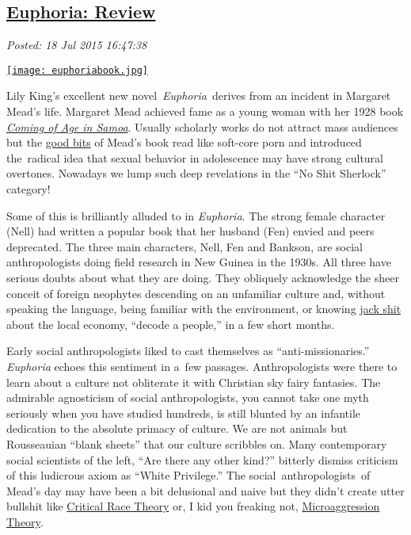 %

\subsection*{\href{https://bakerjd99.wordpress.com/2015/07/18/euphoria-review/}{Euphoria: Review}}


\noindent\emph{Posted: 18 Jul 2015 16:47:38}
\vspace{6pt}

\captionsetup[floatingfigure]{labelformat=empty}
\begin{floatingfigure}[r]{0.25\textwidth}
\centering
\href{http://www.lilykingbooks.com/book/euphoria/}{\texttt{[image: euphoriabook.jpg]}}
\label{fig:5103X0}
\end{floatingfigure}Lily
King's excellent new novel~\emph{Euphoria}~derives from an incident in
Margaret Mead's life. Margaret Mead achieved fame as a young woman with
her 1928 book
\emph{\href{http://www.amazon.com/Coming-Age-Samoa-Psychological-Civilisation/dp/0688050336}{Coming
of Age in Samoa}}. Usually scholarly works do not attract mass audiences
but the \href{https://www.youtube.com/watch?v=wPiHQ37gXnE}{good bits} of
Mead's book read like soft-core porn and introduced the~radical idea
that sexual behavior in adolescence may have strong cultural overtones.
Nowadays we lump such deep revelations in the ``No Shit Sherlock''
category!

Some of this is brilliantly alluded to in \emph{Euphoria}. The strong
female character (Nell) had written a popular book that her husband
(Fen) envied and peers deprecated. The three main characters, Nell, Fen
and Bankson, are social anthropologists doing field research in New
Guinea in the 1930s. All three have serious doubts about what they are
doing. They obliquely acknowledge the sheer conceit of foreign neophytes
descending on an unfamiliar culture and, without speaking the language,
being familiar with the environment, or knowing
\href{http://www.urbandictionary.com/define.php?term=Jack+Shit}{jack
shit} about the local economy, ``decode a people,'' in a few short
months.

Early social anthropologists liked to cast themselves as
``anti-missionaries.'' \emph{Euphoria} echoes this sentiment in a~few
passages. Anthropologists were there to learn about a culture not
obliterate it with Christian sky fairy fantasies. The admirable
agnosticism of social anthropologists, you cannot take one myth
seriously when you have studied hundreds, is still blunted by an
infantile dedication to the absolute primacy of culture. We are not
animals but Rousseauian ``blank sheets'' that our culture scribbles on.
Many contemporary social scientists of the left, ``Are there any other
kind?'' bitterly dismiss criticism of this ludicrous axiom as ``White
Privilege.'' The social~anthropologists~of Mead's day may have been a
bit delusional and naive but they didn't create utter bullshit like
\href{https://en.wikipedia.org/wiki/Critical_race_theory}{Critical Race
Theory} or, I kid you freaking not,
\href{https://en.wikipedia.org/wiki/Microaggression_theory}{Microaggression
Theory}.


